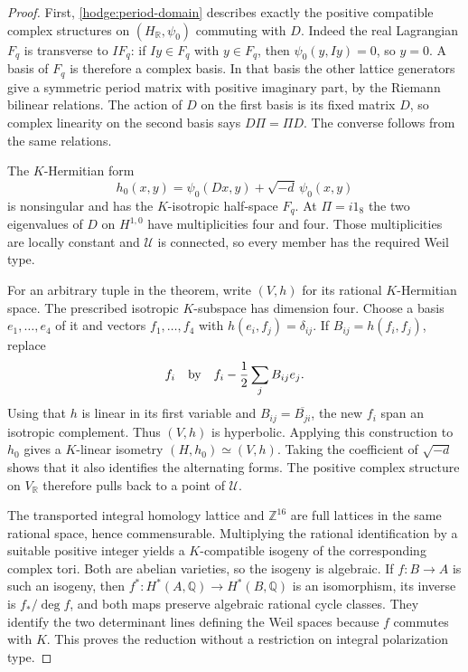 \documentclass[11pt]{article}
\theoremstyle{definition}
\theoremstyle{remark}
\newcommand{\Q}{\mathbb Q}
\newcommand{\R}{\mathbb R}
\newcommand{\Z}{\mathbb Z}
\numberwithin{equation}{section}
\begin{document}
\begin{proof}
First, \eqref{hodge:period-domain} describes exactly the positive compatible
complex structures on $(H_\R,\psi_0)$ commuting with $D$.  Indeed the real
Lagrangian $F_q$ is transverse to $I F_q$: if $Iy\in F_q$ with
$y\in F_q$, then $\psi_0(y,Iy)=0$, so $y=0$.  A basis of $F_q$ is
therefore a complex basis.  In that basis the other lattice generators
give a symmetric period matrix with positive imaginary part, by the
Riemann bilinear relations.  The action of $D$ on the first basis is its
fixed matrix $D$, so complex linearity on the second basis says
$D\Pi=\Pi D$.  The converse follows from the same relations.

The $K$-Hermitian form
\[
 h_0(x,y)=\psi_0(Dx,y)+\sqrt{-d}\,\psi_0(x,y)
\]
is nonsingular and has the $K$-isotropic half-space $F_q$.  At $\Pi=i1_8$
the two eigenvalues of $D$ on $H^{1,0}$ have multiplicities four and four.
Those multiplicities are locally constant and $\mathcal U$ is connected,
so every member has the required Weil type.

For an arbitrary tuple in the theorem, write $(V,h)$ for its rational
$K$-Hermitian space.  The prescribed isotropic $K$-subspace has dimension
four.  Choose a basis $e_1,\ldots,e_4$ of it and vectors
$f_1,\ldots,f_4$ with $h(e_i,f_j)=\delta_{ij}$.
If $B_{ij}=h(f_i,f_j)$, replace
\[
 f_i\quad\hbox{by}\quad
 f_i-\frac12\sum_j B_{ij}e_j.
\]
Using that $h$ is linear in its first variable and
$B_{ij}=\overline{B_{ji}}$, the new $f_i$ span an isotropic complement.
Thus $(V,h)$ is hyperbolic.  Applying this construction to $h_0$ gives a
$K$-linear isometry $(H,h_0)\simeq(V,h)$.  Taking the coefficient of
$\sqrt{-d}$ shows that it also identifies the alternating forms.
The positive complex structure on $V_\R$ therefore pulls back to a
point of $\mathcal U$.

The transported integral homology lattice and $\Z^{16}$ are full lattices
in the same rational space, hence commensurable.  Multiplying the rational
identification by a suitable positive integer yields a $K$-compatible
isogeny of the corresponding complex tori.  Both are abelian varieties,
so the isogeny is algebraic.  If $f:B\to A$ is such an isogeny, then
$f^*:H^*(A,\Q)\to H^*(B,\Q)$ is an isomorphism, its inverse is
$f_*/\deg f$, and both maps preserve algebraic rational cycle classes.
They identify the two determinant lines defining the Weil spaces because
$f$ commutes with $K$.  This proves the reduction without a restriction
on integral polarization type.
\end{proof}
\end{document}
